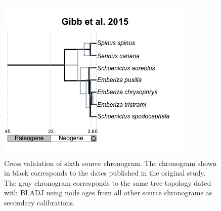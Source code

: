 \documentclass[
  english,
  man]{apa6}
\begin{document}
\begin{figure}[!h]
\includegraphics{../figures/figure-cross-validation/cross_validation_6.png}
\caption{Cross validation of sixth source chronogram. The chronogram shown in black corresponds to the dates published in the original study. The gray chronogram corresponds to the same tree topology dated with BLADJ using node ages from all other source chronograms as secondary calibrations.}
\label{fig:cv6}
\end{figure}
\end{document}
